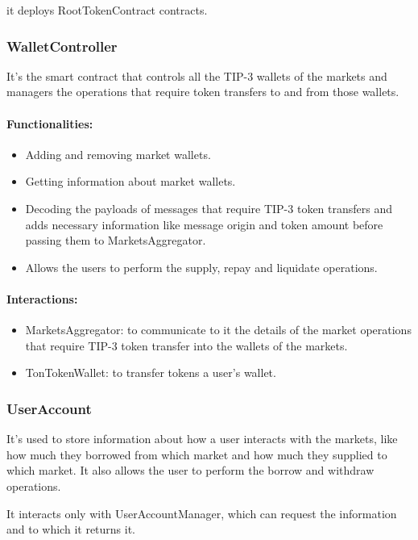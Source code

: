 it deploys RootTokenContract contracts.

\subsubsection{WalletController}

It's the smart contract that controls all the TIP-3 wallets of the markets and managers the operations that require token transfers to and from those wallets.

\paragraph*{Functionalities:}
\begin{itemize}
  \item Adding and removing market wallets.
  \item Getting information about market wallets.
  \item Decoding the payloads of messages that require TIP-3 token transfers and adds necessary information like message origin and token amount before passing them to MarketsAggregator.
  \item Allows the users to perform the supply, repay and liquidate operations.
\end{itemize}

\paragraph*{Interactions:}
\begin{itemize}
  \item MarketsAggregator: to communicate to it the details of the market operations that require TIP-3 token transfer into the wallets of the markets.
  \item TonTokenWallet: to transfer tokens a user's wallet.
\end{itemize}

\subsubsection{UserAccount}

It's used to store information about how a user interacts with the markets, like how much they borrowed from which market and how much they supplied to which market. It also allows the user to perform the borrow and withdraw operations.

It interacts only with UserAccountManager, which can request the information and to which it returns it.

